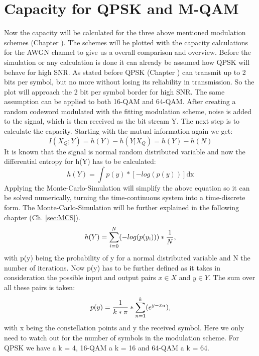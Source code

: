 \section{Capacity for QPSK and M-QAM}
Now the capacity will be calculated for the three above mentioned modulation schemes (Chapter ). The schemes will be plotted with the capacity calculations for the AWGN channel to give us a overall comparison and overview.
\newline
Before the simulation or any calculation is done it can already be assumed how QPSK will behave for high SNR. As stated before QPSK (Chapter ) can transmit up to 2 bits per symbol, but no more without losing its reliability in transmission. So the plot will approach the 2 bit per symbol border for high SNR. The same assumption can be applied to both 16-QAM and 64-QAM.
After creating a random codeword modulated with the fitting modulation scheme, noise is added to the signal, which is then received as the bit stream Y. The next step is to calculate the capacity. 
\newline
Starting with the mutual information again we get:
\begin{equation}
I(X_Q;Y) = h(Y) - h(Y|X_Q) = h(Y) - h(N)
\end{equation}
It is known that the signal is normal random distributed variable and now the differential entropy for h(Y) has to be calculated: 
\begin{equation}
h(Y) = \int p(y) * [-log(p(y))] \mathrm{dx}
\end{equation}
Applying the Monte-Carlo-Simulation will simplify the above equation so it can be solved numerically, turning the time-continuous system into a time-discrete form. The Monte-Carlo-Simulation will be further explained in the following chapter (Ch. \ref{sec:MCS}).
\begin{equation}
\label{eq:entropy1}
h(Y) =  \sum_{i=0}^N(-log(p(y\textsubscript{i}))) * \frac{1}{N},
\end{equation} 
with p(y) being the probability of y for a normal distributed variable and N the number of iterations. Now p(y) has to be further defined as it takes in consideration the possible input and output pairs $x \in X$ and $y \in Y$. The sum over all these pairs is taken:
\begin{equation}
\label{eq:entropy2}
p(y) = \frac{1}{k*\pi}*\sum_{n=1}^k(e^{y-x\textsubscript{n}}),
\end{equation} 
with x being the constellation points and y the received symbol.
Here we only need to watch out for the number of symbols in the modulation scheme. For QPSK we have a k = 4, 16-QAM a k = 16 and 64-QAM a k = 64.
\newline
